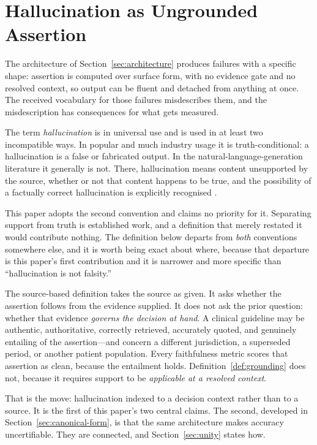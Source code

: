 \section{Hallucination as Ungrounded Assertion}
\label{sec:taxonomy}

The architecture of Section~\ref{sec:architecture} produces failures with a specific
shape: assertion is computed over surface form, with no evidence gate and no resolved
context, so output can be fluent and detached from anything at once. The received
vocabulary for those failures misdescribes them, and the misdescription has consequences
for what gets measured.

The term \emph{hallucination} is in universal use and is used in at least two
incompatible ways. In popular and much industry usage it is truth-conditional: a
hallucination is a false or fabricated output. In the natural-language-generation
literature it generally is not. There, hallucination means content unsupported by
the source, whether or not that content happens to be true, and the possibility of a
factually correct hallucination is explicitly recognised
\citep{maynez2020,ji2023}.

This paper adopts the second convention and claims no priority for it. Separating
support from truth is established work, and a definition that merely restated it
would contribute nothing. The definition below departs from \emph{both} conventions
somewhere else, and it is worth being exact about where, because that departure is
this paper's first contribution and it is narrower and more specific than
``hallucination is not falsity.''

The source-based definition takes the source as given. It asks whether the assertion
follows from the evidence supplied. It does not ask the prior question: whether that
evidence \emph{governs the decision at hand}. A clinical guideline may be authentic,
authoritative, correctly retrieved, accurately quoted, and genuinely entailing of the
assertion---and concern a different jurisdiction, a superseded period, or another
patient population. Every faithfulness metric scores that assertion as clean, because
the entailment holds. Definition~\ref{def:grounding} does not, because it requires
support to be \emph{applicable at a resolved context}.

That is the move: hallucination indexed to a decision context rather than to a
source. It is the first of this paper's two central claims. The second, developed in
Section~\ref{sec:canonical-form}, is that the same architecture makes accuracy
uncertifiable. They are connected, and Section~\ref{sec:unity} states how.

